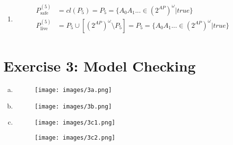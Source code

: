 \documentclass{article}
\begin{document}
\begin{enumerate}[a]
    \item 
    \begin{equation*}
        \begin{split}
            P_{\text{safe}}^{(5)} &= cl(P_5) = P_5 = \{ A_0 A_1 ... \in (2^{AP})^\omega | true \}\\
            P_{\text{live}}^{(5)} &= P_5 \cup [(2^{AP})^\omega \setminus P_5] = P_5 = \{ A_0 A_1 ... \in (2^{AP})^\omega | true \}\\
        \end{split}
    \end{equation*}
\end{enumerate}

\newpage
\section*{Exercise 3: Model Checking}

\begin{enumerate}[a)]
    \item \text{}
    \begin{figure}[H]
        \centering
        \texttt{[image: images/3a.png]}
        \caption{}
        \label{fig:3a}
    \end{figure}
    
    \item\text{}
    \begin{figure}[H]
        \centering
        \texttt{[image: images/3b.png]}
        \caption{}
        \label{fig:3b}
    \end{figure}

    \item\text{}
    \begin{figure}[H]
        \centering
        \texttt{[image: images/3c1.png]}
        \caption{}
        \label{fig:3c1}
    \end{figure}

    \begin{figure}[H]
        \centering
        \texttt{[image: images/3c2.png]}
        \caption{}
        \label{fig:3c2}
    \end{figure}
\end{enumerate}
\end{document}
